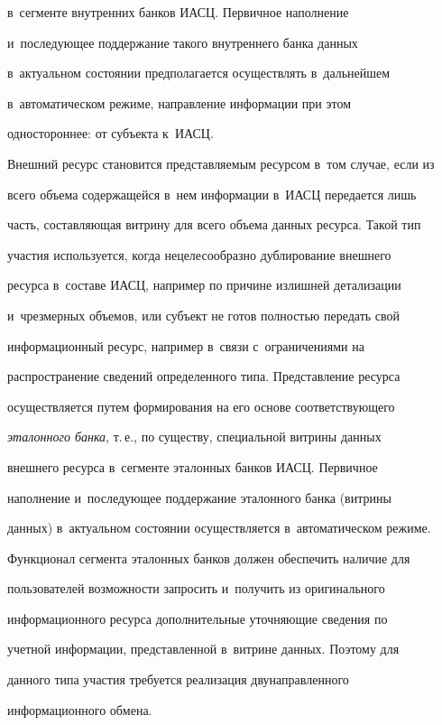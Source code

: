 в~сегменте внут\-рен\-них банков ИАСЦ. Первичное наполнение 


и~последующее поддержание такого внут\-рен\-не\-го банка данных 


в~актуальном со\-сто\-янии предполагается осуществлять в~дальнейшем 


в~автоматическом режиме, направление информации при этом 


одностороннее: от субъекта к~ИАСЦ.





Внешний ресурс становится представляемым ресурсом в~том случае, если из 


всего объема содержащейся в~нем информации в~ИАСЦ передается лишь 


часть, составляющая витрину для всего объема данных ресурса. Такой тип 


участия используется, когда нецелесообразно дублирование внешнего 


ресурса в~составе ИАСЦ, например по причине излишней детализации 


и~чрезмерных объемов, или субъект не готов полностью передать свой 


информационный ресурс, например в~связи с~ограничениями на 


распространение сведений определенного типа. Представление ресурса 


осуществляется путем формирования на его основе соответствующего 


\textit{эталонного банка}, т.\,е., по существу, специальной витрины данных 


внешнего ресурса в~сегменте эталонных банков ИАСЦ. Первичное 


наполнение и~последующее поддержание эталонного банка (витрины 


данных) в~актуальном состоянии осуществляется в~автоматическом режиме. 


Функционал сегмента эталонных банков должен обеспечить наличие для 


пользователей возможности запросить и~получить из оригинального 


информационного ресурса дополнительные уточняющие сведения по 


учетной информации, представленной в~витрине данных. Поэтому для 


данного типа участия требуется реализация двунаправленного 


информационного обмена.





